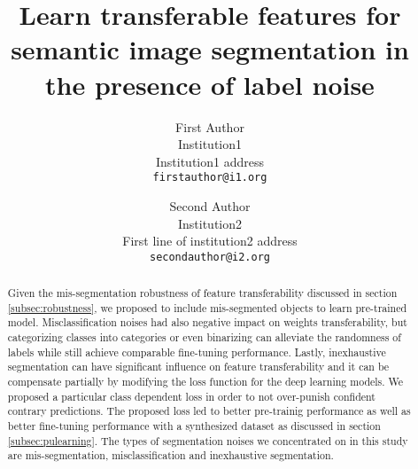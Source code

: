 \documentclass[10pt,twocolumn,letterpaper]{article}
\begin{document}
\onecolumn
{}


\twocolumn
{}
\newpage
\title{Learn transferable features for semantic image segmentation in the presence of label noise}

\author{First Author\\
Institution1\\
Institution1 address\\
{\tt\small firstauthor@i1.org}
\and
Second Author\\
Institution2\\
First line of institution2 address\\
{\tt\small secondauthor@i2.org}
}

\maketitle


\begin{abstract}
Given the mis-segmentation robustness of feature transferability discussed in section \ref{subsec:robustness}, we proposed to include mis-segmented objects to learn pre-trained model.
Misclassification noises had also negative impact on weights transferability, but categorizing classes into categories or even binarizing can alleviate the randomness of labels while still achieve comparable fine-tuning performance.
Lastly, inexhaustive segmentation can have significant influence on feature transferability and it can be compensate partially by modifying the loss function for the deep learning models.
We proposed a particular class dependent loss in order to not over-punish confident contrary predictions.
The proposed loss led to better pre-trainig performance as well as better fine-tuning performance with a synthesized dataset as discussed in section \ref{subsec:pulearning}.
The types of segmentation noises we concentrated on in this study are mis-segmentation, misclassification and inexhaustive segmentation.

\end{abstract}


















{\small


}

\clearpage

\end{document}
